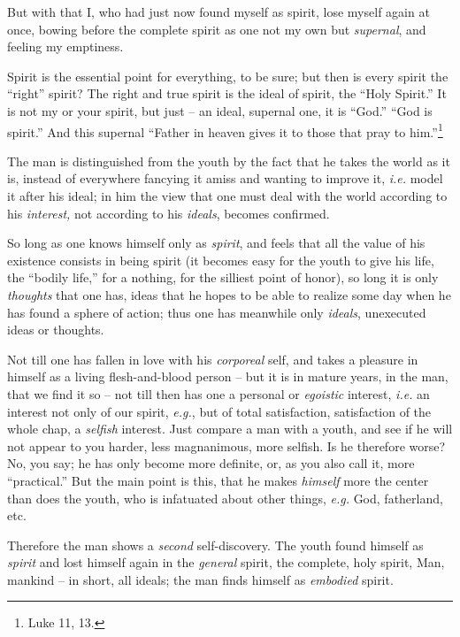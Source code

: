 But with that I, who had just now found myself as spirit, lose myself again at 
once, bowing before the complete spirit as one not my own but 
\textit{supernal}, and feeling my emptiness.

Spirit is the essential point for everything, to be sure; but then is every 
spirit the ``right'' spirit? The right and true spirit is the ideal of 
spirit, the ``Holy Spirit.'' It is not my or your spirit, but just -- an 
ideal, supernal one, it is ``God.'' ``God is spirit.'' And this supernal 
``Father in heaven gives it to those that pray to him.''\footnote{Luke 11, 
13.}

The man is distinguished from the youth by the fact that he takes the world as 
it is, instead of everywhere fancying it amiss and wanting to improve it, 
\textit{i.e.} model it after his ideal; in him the view that one must deal 
with the world according to his \textit{interest,} not according to his 
\textit{ideals}, becomes confirmed.

So long as one knows himself only as \textit{spirit}, and feels that all the 
value of his existence consists in being spirit (it becomes easy for the youth 
to give his life, the ``bodily life,'' for a nothing, for the silliest point 
of honor), so long it is only \textit{thoughts} that one has, ideas that he 
hopes to be able to realize some day when he has found a sphere of action; 
thus one has meanwhile only \textit{ideals}, unexecuted ideas or thoughts.

Not till one has fallen in love with his \textit{corporeal} self, and takes a 
pleasure in himself as a living flesh-and-blood person -- but it is in mature 
years, in the man, that we find it so -- not till then has one a personal or 
\textit{egoistic} interest, \textit{i.e.} an interest not only of our spirit, 
\textit{e.g.}, but of total satisfaction, satisfaction of the whole chap, a 
\textit{selfish} interest. Just compare a man with a youth, and see if he will 
not appear to you harder, less magnanimous, more selfish. Is he therefore 
worse? No, you say; he has only become more definite, or, as you also call it, 
more ``practical.'' But the main point is this, that he makes 
\textit{himself} more the center than does the youth, who is infatuated about 
other things, \textit{e.g.} God, fatherland, etc.

Therefore the man shows a \textit{second} self-discovery. The youth found 
himself as \textit{spirit} and lost himself again in the \textit{general} 
spirit, the complete, holy spirit, Man, mankind -- in short, all ideals; the 
man finds himself as \textit{embodied} spirit.

